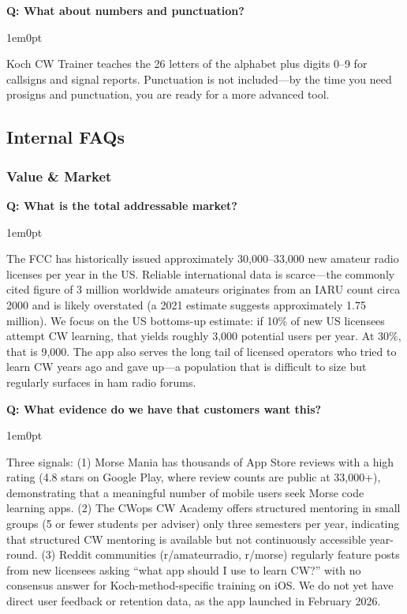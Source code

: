 \documentclass[11pt,letterpaper]{article}
\newenvironment{faqpair}[1]{%
  \vspace{0.5em}%
  \noindent\textbf{\color{SectionBlue}Q: #1}\par%
  \vspace{0.2em}%
  \begin{adjustwidth}{1em}{0pt}%
  \setlength{\parindent}{0pt}%
}{%
  \end{adjustwidth}%
  \vspace{0.5em}%
}
\begin{document}
\begin{faqpair}{What about numbers and punctuation?}
  Koch CW Trainer teaches the 26 letters of the alphabet plus digits 0--9 for callsigns and signal reports. Punctuation is not included---by the time you need prosigns and punctuation, you are ready for a more advanced tool.
\end{faqpair}


\subsection*{Internal FAQs}

\subsubsection*{Value \& Market}

\begin{faqpair}{What is the total addressable market?}
  The FCC has historically issued approximately 30,000--33,000 new amateur radio licenses per year in the US. Reliable international data is scarce---the commonly cited figure of 3 million worldwide amateurs originates from an IARU count circa 2000 and is likely overstated (a 2021 estimate suggests approximately 1.75 million). We focus on the US bottoms-up estimate: if 10\% of new US licensees attempt CW learning, that yields roughly 3,000 potential users per year. At 30\%, that is 9,000. The app also serves the long tail of licensed operators who tried to learn CW years ago and gave up---a population that is difficult to size but regularly surfaces in ham radio forums.
\end{faqpair}

\begin{faqpair}{What evidence do we have that customers want this?}
  Three signals: (1) Morse Mania has thousands of App Store reviews with a high rating (4.8 stars on Google Play, where review counts are public at 33,000+), demonstrating that a meaningful number of mobile users seek Morse code learning apps. (2) The CWops CW Academy offers structured mentoring in small groups (5 or fewer students per adviser) only three semesters per year, indicating that structured CW mentoring is available but not continuously accessible year-round. (3) Reddit communities (r/amateurradio, r/morse) regularly feature posts from new licensees asking ``what app should I use to learn CW?'' with no consensus answer for Koch-method-specific training on iOS. We do not yet have direct user feedback or retention data, as the app launched in February 2026.
\end{faqpair}
\end{document}
